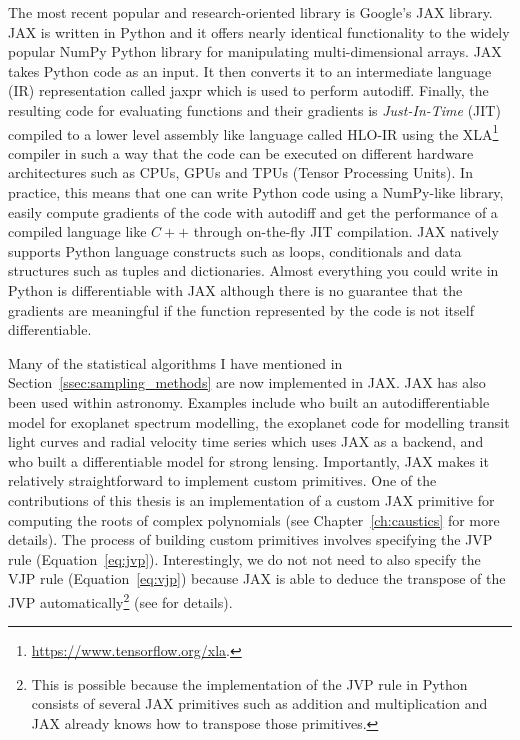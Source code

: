 \documentclass[12pt,dvipsnames]{report}
\newcommand{\ssf}[1]{\textsf{#1}}
\begin{document}
The most recent popular and research-oriented library is Google's \ssf{JAX} library.
\ssf{JAX} is written in \ssf{Python} and it offers nearly identical functionality 
to the widely popular \ssf{NumPy} \ssf{Python} library for manipulating 
multi-dimensional arrays. \ssf{JAX} takes Python code as an input. It then converts it 
to an intermediate language (IR) representation called \ssf{jaxpr} which is 
used to perform autodiff. Finally, the resulting code for evaluating functions 
and their gradients is \emph{Just-In-Time} (JIT) compiled to a lower level 
assembly like language called \ssf{HLO-IR} using the 
\ssf{XLA}\footnote{\url{https://www.tensorflow.org/xla}.} compiler in such a way 
that the code can be executed on different hardware architectures such  as 
CPUs, GPUs and TPUs (Tensor Processing Units).
In practice, this means that one can write \ssf{Python} code using a \ssf{NumPy}-like 
library, easily compute gradients of the code with autodiff and get 
the performance of a compiled language like $C++$ through on-the-fly JIT 
compilation. \ssf{JAX} natively supports \ssf{Python} language constructs such 
as loops, conditionals and data structures such as tuples and dictionaries.
Almost everything you could write in \ssf{Python} is differentiable with 
\ssf{JAX} although there is no guarantee that the gradients are meaningful 
if the function represented by the code is not itself differentiable.

Many of the statistical algorithms I have mentioned  in 
Section~\ref{ssec:sampling_methods} are now implemented in \ssf{JAX}. 
\ssf{JAX} has also been used within astronomy. Examples include 
\citet{2022ApJS..258...31K} who built 
an autodifferentiable model for exoplanet spectrum modelling, 
the \ssf{exoplanet} code \citet{2021JOSS....6.3285F} for modelling transit light 
curves and radial velocity time series which uses \ssf{JAX} as a backend, and 
\citet{2022arXiv220207663G} who built a differentiable model 
for strong lensing. Importantly, \ssf{JAX} makes it relatively 
straightforward to implement custom primitives. One of the contributions of this 
thesis is an implementation of a custom JAX primitive for computing the roots 
of complex polynomials (see Chapter~\ref{ch:caustics} for more details).
The process of building custom primitives involves specifying the JVP rule 
(Equation~\ref{eq:jvp}). Interestingly, we do not not need to also specify the VJP 
rule (Equation~\ref{eq:vjp}) because 
\ssf{JAX} is able to deduce the transpose of the JVP automatically\footnote{
    This is possible because the implementation of the JVP rule 
    in \ssf{Python} consists of several \ssf{JAX} primitives such as addition
    and multiplication and \ssf{JAX} already knows how to transpose those 
    primitives.} (see \citet{arXiv:2105.09469} for details). 
\end{document}
